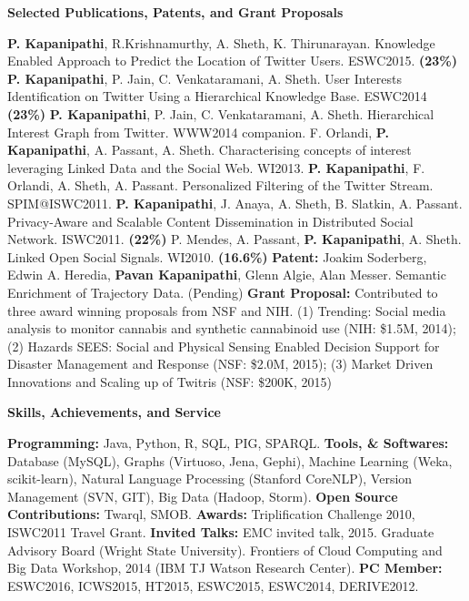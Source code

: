 \documentclass[letterpaper,10pt]{article}
\newcommand{\resheading}[1]{{\colorbox{mygrey}{\begin{minipage}{\textwidth}{\textbf{#1 \vphantom{p\^{E}}}}\end{minipage}}}}
\begin{document}
\resheading{Selected Publications, Patents, and Grant Proposals}\vspace{0.05in}
\textbf{P. Kapanipathi}, R.Krishnamurthy, A. Sheth, K. Thirunarayan. Knowledge Enabled Approach to Predict the Location of Twitter Users. ESWC2015. \textbf{(23\%)}\linebreak
\textbf{P. Kapanipathi}, P. Jain, C. Venkataramani, A. Sheth. User Interests Identification on Twitter Using a Hierarchical Knowledge Base. ESWC2014 \textbf{(23\%)}\linebreak
\textbf{P. Kapanipathi}, P. Jain, C. Venkataramani, A. Sheth. Hierarchical Interest Graph from Twitter. WWW2014 companion. \linebreak
F. Orlandi, \textbf{P. Kapanipathi}, A. Passant, A. Sheth. Characterising concepts of interest leveraging Linked Data and the Social Web. WI2013.\linebreak
\textbf{P. Kapanipathi}, F. Orlandi, A. Sheth, A. Passant. Personalized Filtering of the Twitter Stream. SPIM@ISWC2011.\linebreak 
\textbf{P. Kapanipathi}, J. Anaya, A. Sheth, B. Slatkin, A. Passant. Privacy-Aware and Scalable Content Dissemination in Distributed Social Network. ISWC2011. \textbf{(22\%)}\linebreak
P. Mendes, A. Passant, \textbf{P. Kapanipathi}, A. Sheth. Linked Open Social Signals. WI2010. \textbf{(16.6\%)}\linebreak
\textbf{Patent:} Joakim Soderberg, Edwin A. Heredia, \textbf{Pavan Kapanipathi}, Glenn Algie,  Alan Messer. Semantic Enrichment of Trajectory Data. (Pending)\linebreak
\textbf{Grant Proposal: }  Contributed to three award winning proposals from NSF and NIH. (1) Trending: Social media analysis to monitor cannabis and synthetic cannabinoid use (NIH: \$1.5M, 2014); (2) Hazards SEES: Social and Physical Sensing Enabled Decision Support for Disaster Management and Response (NSF: \$2.0M, 2015); (3) Market Driven Innovations and Scaling up of Twitris (NSF: \$200K, 2015) \vspace{0.05in}

\resheading{Skills, Achievements, and Service}\vspace{0.05in}
\textbf{Programming:} Java, Python, R, SQL, PIG, SPARQL.\linebreak
\textbf{Tools, \& Softwares:} Database (MySQL), Graphs (Virtuoso, Jena, Gephi), Machine Learning (Weka, scikit-learn), Natural Language Processing (Stanford CoreNLP), Version Management (SVN, GIT), Big Data (Hadoop, Storm).\linebreak
\textbf{Open Source Contributions:} Twarql, SMOB.\linebreak 
\textbf{Awards: }Triplification Challenge 2010, ISWC2011 Travel Grant. \linebreak
\textbf{Invited Talks:} EMC invited talk, 2015. Graduate Advisory Board (Wright State University). Frontiers of Cloud Computing and Big Data Workshop, 2014 (IBM TJ Watson Research Center). \linebreak
\textbf{PC Member: } ESWC2016, ICWS2015, HT2015, ESWC2015, ESWC2014, DERIVE2012.\vspace{0.05in}
\end{document}
